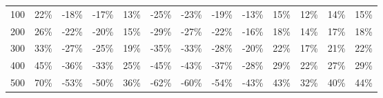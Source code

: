 \begin{sidewaystable}[p]
\begin{tabular}{@{}lrrrrrrrrrrrr@{}}
    100 & 22\% & -18\% & -17\% & 13\% & -25\% & -23\% & -19\% & -13\% & 15\% & 12\% & 14\% & 15\% \\
    200 & 26\% & -22\% & -20\% & 15\% & -29\% & -27\% & -22\% & -16\% & 18\% & 14\% & 17\% & 18\% \\
    300 & 33\% & -27\% & -25\% & 19\% & -35\% & -33\% & -28\% & -20\% & 22\% & 17\% & 21\% & 22\% \\
    400 & 45\% & -36\% & -33\% & 25\% & -45\% & -43\% & -37\% & -28\% & 29\% & 22\% & 27\% & 29\% \\
    500 & 70\% & -53\% & -50\% & 36\% & -62\% & -60\% & -54\% & -43\% & 43\% & 32\% & 40\% & 44\% \\
    \bottomrule
    \end{tabular}
    \\ 
\end{sidewaystable}


